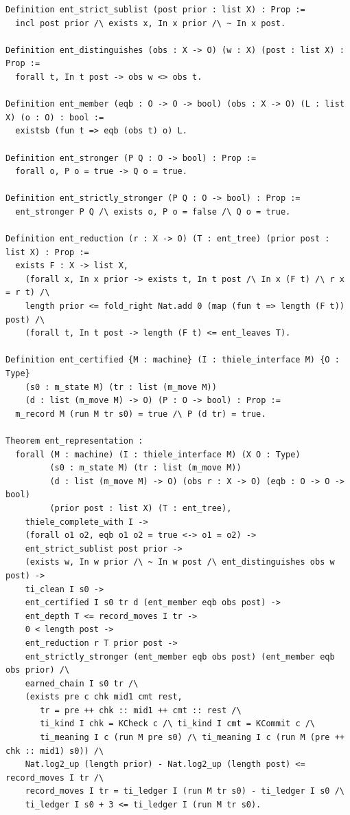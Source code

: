 {\tiny
\begin{verbatim}
Definition ent_strict_sublist (post prior : list X) : Prop :=
  incl post prior /\ exists x, In x prior /\ ~ In x post.

Definition ent_distinguishes (obs : X -> O) (w : X) (post : list X) : Prop :=
  forall t, In t post -> obs w <> obs t.

Definition ent_member (eqb : O -> O -> bool) (obs : X -> O) (L : list X) (o : O) : bool :=
  existsb (fun t => eqb (obs t) o) L.

Definition ent_stronger (P Q : O -> bool) : Prop :=
  forall o, P o = true -> Q o = true.

Definition ent_strictly_stronger (P Q : O -> bool) : Prop :=
  ent_stronger P Q /\ exists o, P o = false /\ Q o = true.

Definition ent_reduction (r : X -> O) (T : ent_tree) (prior post : list X) : Prop :=
  exists F : X -> list X,
    (forall x, In x prior -> exists t, In t post /\ In x (F t) /\ r x = r t) /\
    length prior <= fold_right Nat.add 0 (map (fun t => length (F t)) post) /\
    (forall t, In t post -> length (F t) <= ent_leaves T).

Definition ent_certified {M : machine} (I : thiele_interface M) {O : Type}
    (s0 : m_state M) (tr : list (m_move M))
    (d : list (m_move M) -> O) (P : O -> bool) : Prop :=
  m_record M (run M tr s0) = true /\ P (d tr) = true.

Theorem ent_representation :
  forall (M : machine) (I : thiele_interface M) (X O : Type)
         (s0 : m_state M) (tr : list (m_move M))
         (d : list (m_move M) -> O) (obs r : X -> O) (eqb : O -> O -> bool)
         (prior post : list X) (T : ent_tree),
    thiele_complete_with I ->
    (forall o1 o2, eqb o1 o2 = true <-> o1 = o2) ->
    ent_strict_sublist post prior ->
    (exists w, In w prior /\ ~ In w post /\ ent_distinguishes obs w post) ->
    ti_clean I s0 ->
    ent_certified I s0 tr d (ent_member eqb obs post) ->
    ent_depth T <= record_moves I tr ->
    0 < length post ->
    ent_reduction r T prior post ->
    ent_strictly_stronger (ent_member eqb obs post) (ent_member eqb obs prior) /\
    earned_chain I s0 tr /\
    (exists pre c chk mid1 cmt rest,
       tr = pre ++ chk :: mid1 ++ cmt :: rest /\
       ti_kind I chk = KCheck c /\ ti_kind I cmt = KCommit c /\
       ti_meaning I c (run M pre s0) /\ ti_meaning I c (run M (pre ++ chk :: mid1) s0)) /\
    Nat.log2_up (length prior) - Nat.log2_up (length post) <= record_moves I tr /\
    record_moves I tr = ti_ledger I (run M tr s0) - ti_ledger I s0 /\
    ti_ledger I s0 + 3 <= ti_ledger I (run M tr s0).
\end{verbatim}}

